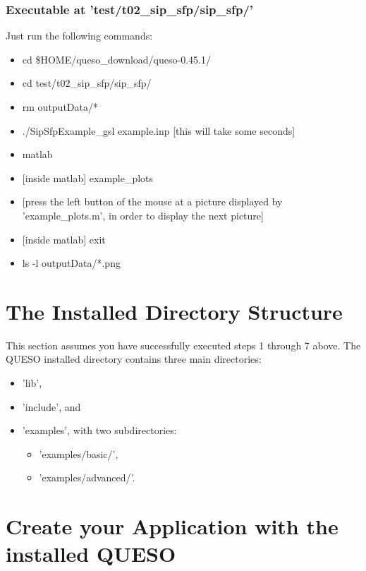 

\subsubsection{Executable at 'test/t02\_sip\_sfp/sip\_sfp/'}\label{subsc-t02}

Just run the following commands:
\begin{itemize}
\item cd \$HOME/queso\_download/queso-0.45.1/
\item cd test/t02\_sip\_sfp/sip\_sfp/
\item rm outputData/*
\item ./SipSfpExample\_gsl example.inp [this will take some seconds]
\item matlab
\item {[inside matlab]} example\_plots
\item {[press the left button of the mouse at a picture displayed by 'example\_plots.m', in order to display the next picture]}
\item {[inside matlab]} exit
\item ls -l outputData/*.png
\end{itemize}

\section{The Installed Directory Structure} \label{sc-installed-dir-structure}

This section assumes you have successfully executed steps 1 through 7 above.
The QUESO installed directory contains three main directories:
\begin{itemize}
\item 'lib',
\item 'include', and
\item {'examples', with two subdirectories:
\begin{itemize}
\item 'examples/basic/',
\item 'examples/advanced/'.
\end{itemize}
}
\end{itemize}

\section{Create your Application with the installed QUESO} \label{sc-use-queso}

